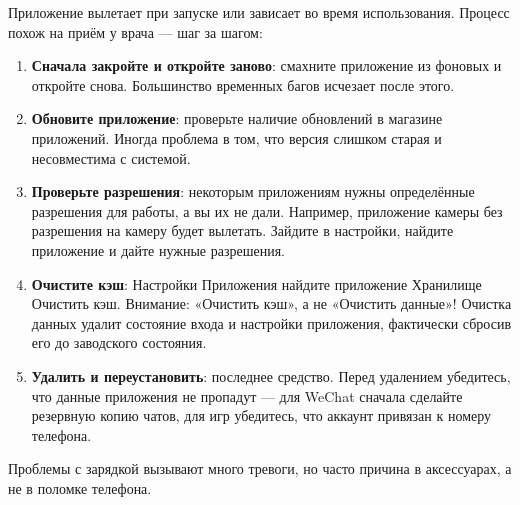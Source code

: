 
Приложение вылетает при запуске или зависает во время использования. Процесс похож на приём у врача — шаг за шагом:

\begin{enumerate}
  \item \textbf{Сначала закройте и откройте заново}: смахните приложение из фоновых и откройте снова. Большинство временных багов исчезает после этого.
  \item \textbf{Обновите приложение}: проверьте наличие обновлений в магазине приложений. Иногда проблема в том, что версия слишком старая и несовместима с системой.
  \item \textbf{Проверьте разрешения}: некоторым приложениям нужны определённые разрешения для работы, а вы их не дали. Например, приложение камеры без разрешения на камеру будет вылетать. Зайдите в настройки, найдите приложение и дайте нужные разрешения.
  \item \textbf{Очистите кэш}: Настройки Приложения найдите приложение Хранилище Очистить кэш. Внимание: «Очистить кэш», а не «Очистить данные»! Очистка данных удалит состояние входа и настройки приложения, фактически сбросив его до заводского состояния.
  \item \textbf{Удалить и переустановить}: последнее средство. Перед удалением убедитесь, что данные приложения не пропадут — для WeChat сначала сделайте резервную копию чатов, для игр убедитесь, что аккаунт привязан к номеру телефона.
\end{enumerate}


Проблемы с зарядкой вызывают много тревоги, но часто причина в аксессуарах, а не в поломке телефона.

